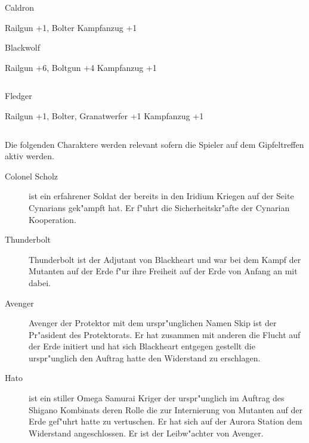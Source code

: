 \begin{column}[l]{0.45}
    \begin{nscsheet}[h]{Caldron}
        \nscstats[ATT=2,AGG=3,CON=2]
        \nscruler
        \begin{nscinventory}
            \nscitem[Waffen] Railgun +1, Bolter
            \nscitem[R"ustung] Kampfanzug +1
        \end{nscinventory}
    \end{nscsheet}

    \begin{nscsheet}[h]{Blackwolf}
        \nscstats[ATT=2,AGG=3,CON=2]
        \nscruler
        \begin{nscinventory}
            \nscitem[Waffen] Railgun +6, Boltgun +4
            \nscitem[R"ustung] Kampfanzug +1
        \end{nscinventory}
    \end{nscsheet}    
\end{column}
\begin{column}[r]{0.45}
    \begin{nscsheet}[h]{Fledger}
        \nscstats[ATT=2,AGG=3,CON=2]
        \nscruler
        \begin{nscinventory}
            \nscitem[Waffen] Railgun +1, Bolter, Granatwerfer +1
            \nscitem[R"ustung] Kampfanzug +1
        \end{nscinventory}
    \end{nscsheet}        
\end{column}


Die folgenden Charaktere werden relevant sofern die Spieler auf dem Gipfeltreffen aktiv werden.

\begin{description}
    \item[Colonel Scholz] ist ein erfahrener Soldat der bereits in den Iridium Kriegen auf der Seite Cynarians gek"ampft hat. Er f"uhrt 
        die Sicherheitskr"afte der Cynarian Kooperation.
    \item[Thunderbolt] Thunderbolt ist der Adjutant von Blackheart und war bei dem Kampf der Mutanten auf der Erde f"ur ihre Freiheit auf 
        der Erde von Anfang an mit dabei.
    \item[Avenger] Avenger der Protektor mit dem urspr"unglichen Namen Skip ist der Pr"asident des Protektorats. Er hat zusammen mit 
        anderen die Flucht auf der Erde initiert und hat sich Blackheart entgegen gestellt die urspr"unglich den Auftrag hatte den Widerstand zu erschlagen.
    \item[Hato] ist ein stiller Omega Samurai Kriger der urspr"unglich im Auftrag des Shigano Kombinats deren Rolle die zur Internierung 
        von Mutanten auf der Erde gef"uhrt hatte zu vertuschen. Er hat sich auf der Aurora Station dem Widerstand angeschlossen. Er ist der Leibw"achter von Avenger.
\end{description}
\vfill\pagebreak

